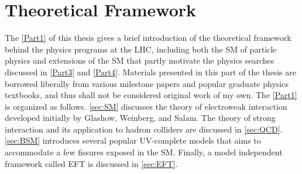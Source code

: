 \part{Theoretical Framework}
\label{Part1}
The \autoref{Part1} of this thesis gives a brief introduction of the theoretical framework behind the physics programs at the \ac{LHC}, including both the \ac{SM} of particle physics and extensions of the \ac{SM} that partly motivate the physics searches discussed in \autoref{Part3} and \autoref{Part4}. Materials presented in this part of the thesis are borrowed liberally from various milestone papers and popular graduate physics textbooks, and thus shall not be considered original work of my own. The \autoref{Part1} is organized as follows. \autoref{sec:SM} discusses the theory of electroweak interaction developed initially by Glashow, Weinberg, and Salam. The theory of strong interaction and its application to hadron colliders are discussed in \autoref{sec:QCD}. \autoref{sec:BSM} introduces several popular \ac{UV}-complete models that aims to accommodate a few fissures exposed in the \ac{SM}. Finally, a model independent framework called \ac{EFT} is discussed in \autoref{sec:EFT}.





